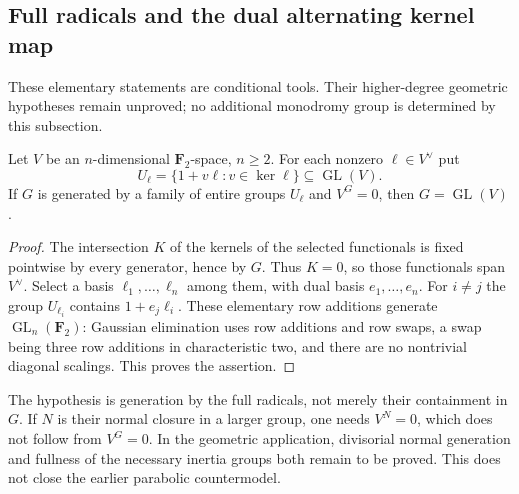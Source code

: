 \subsection{Full radicals and the dual alternating kernel map}
These elementary statements are conditional tools. Their higher-degree
geometric hypotheses remain unproved; no additional monodromy group is
determined by this subsection.
\begin{lemma}
\label{lem:root-full-radical-generation}
Let $V$ be an $n$-dimensional $\mathbf F_2$-space, $n\geq2$. For each
nonzero $\ell\in V^\vee$ put
\[
 U_\ell=\{1+v\ell:v\in\ker\ell\}\subseteq\operatorname{GL}(V).
\]
If $G$ is generated by a family of entire groups $U_\ell$ and $V^G=0$,
then $G=\operatorname{GL}(V)$.
\end{lemma}
\begin{proof}
The intersection $K$ of the kernels of the selected
functionals is fixed pointwise by every generator, hence by $G$.
Thus $K=0$, so those functionals span $V^\vee$. Select a basis
$\ell_1,\ldots,\ell_n$ among them, with dual basis $e_1,\ldots,e_n$.
For $i\ne j$ the group $U_{\ell_i}$ contains $1+e_j\ell_i$.
These elementary row additions generate $\operatorname{GL}_n(\mathbf F_2)$:
Gaussian elimination uses row additions and row swaps, a swap being
three row additions in characteristic two, and there are no nontrivial
diagonal scalings. This proves the assertion.
\end{proof}

The hypothesis is generation by the full radicals, not merely their
containment in $G$. If $N$ is their normal closure in a larger group,
one needs $V^N=0$, which does not follow from $V^G=0$. In the geometric
application, divisorial normal generation and fullness of the necessary
inertia groups both remain to be proved. This does not close the earlier
parabolic countermodel.

